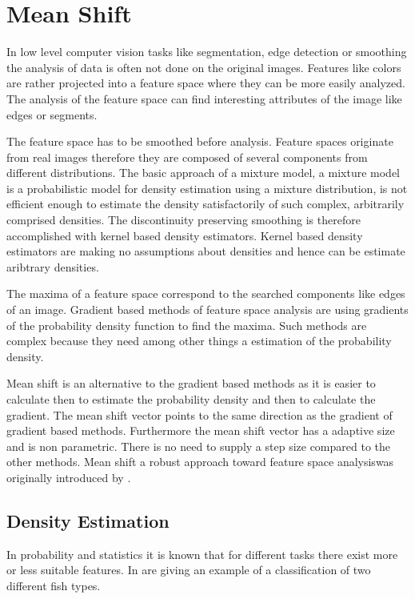 \chapter{Mean Shift}\label{ch:mean_shift}
In low level computer vision tasks like segmentation, edge detection or smoothing
the analysis of data is often not done on the original images. Features like 
colors are rather projected into a feature space where they can be more easily
analyzed. The analysis of the feature space can find interesting attributes of 
the image like edges or segments.

The feature space has to be smoothed before analysis. Feature spaces originate
from real images therefore they are composed of several components from
different distributions. The basic approach of a mixture model, a mixture model
is a probabilistic model for density estimation using a mixture distribution, is
not efficient enough to estimate the density satisfactorily of such complex,
arbitrarily comprised densities. The discontinuity preserving smoothing is therefore
accomplished with kernel based density estimators. Kernel based density estimators
are making no assumptions about densities and hence can be estimate aribtrary 
densities.

The maxima of a feature space correspond to the searched components like edges
of an image. Gradient based methods of feature space analysis are using gradients
of the probability density function to find the maxima. Such methods are complex
because they need among other things a estimation of the probability density.

Mean shift is an alternative to the gradient based methods as it is easier to 
calculate then to estimate the probability density and then to calculate the 
gradient. The mean shift vector points to the same direction as the gradient of
gradient based methods. Furthermore the mean shift vector has a adaptive size and
is non parametric. There is no need to supply a step size compared to the other
methods. Mean shift a robust approach toward feature space analysiswas
originally introduced by \citeauthor{citeulike:462300} \citep{citeulike:462300}.

\section{Density Estimation} %
\label{sec:density_estimation}
In probability and statistics it is known that for different tasks there exist 
more or less suitable features. In 
\citep{citeulike:167581} \citeauthor{citeulike:167581}  are giving an example of 
a classification of two different fish types. 


